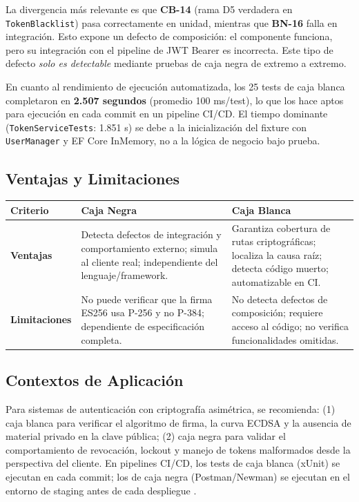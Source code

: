 \documentclass[11pt,a4paper]{article}
\begin{document}
La divergencia más relevante es que \textbf{CB-14} (rama D5 verdadera en \texttt{TokenBlacklist}) pasa correctamente en unidad, mientras que \textbf{BN-16} falla en integración. Esto expone un defecto de composición: el componente funciona, pero su integración con el pipeline de JWT Bearer es incorrecta. Este tipo de defecto \emph{solo es detectable} mediante pruebas de caja negra de extremo a extremo.

En cuanto al rendimiento de ejecución automatizada, los 25 tests de caja blanca completaron en \textbf{2.507 segundos} (promedio 100 ms/test), lo que los hace aptos para ejecución en cada commit en un pipeline CI/CD. El tiempo dominante (\texttt{TokenServiceTests}: 1.851 s) se debe a la inicialización del fixture con \texttt{UserManager} y EF Core InMemory, no a la lógica de negocio bajo prueba.

\subsection{Ventajas y Limitaciones}

\begin{center}
\renewcommand{\arraystretch}{1.3}
\begin{tabular}{|p{2cm}|p{5.5cm}|p{5.5cm}|}
\hline
\rowcolor{headerblue}
\color{white}\textbf{Criterio} & \color{white}\textbf{Caja Negra} & \color{white}\textbf{Caja Blanca} \\
\hline
\textbf{Ventajas} & Detecta defectos de integración y comportamiento externo; simula al cliente real; independiente del lenguaje/framework. & Garantiza cobertura de rutas criptográficas; localiza la causa raíz; detecta código muerto; automatizable en CI. \\
\hline
\rowcolor{rowgray}
\textbf{Limitaciones} & No puede verificar que la firma ES256 usa P-256 y no P-384; dependiente de especificación completa. & No detecta defectos de composición; requiere acceso al código; no verifica funcionalidades omitidas. \\
\hline
\end{tabular}
\end{center}

\subsection{Contextos de Aplicación}

Para sistemas de autenticación con criptografía asimétrica, se recomienda: (1) caja blanca para verificar el algoritmo de firma, la curva ECDSA y la ausencia de material privado en la clave pública; (2) caja negra para validar el comportamiento de revocación, lockout y manejo de tokens malformados desde la perspectiva del cliente. En pipelines CI/CD, los tests de caja blanca (xUnit) se ejecutan en cada commit; los de caja negra (Postman/Newman) se ejecutan en el entorno de staging antes de cada despliegue \cite{cohn2009succeeding}.
\end{document}
